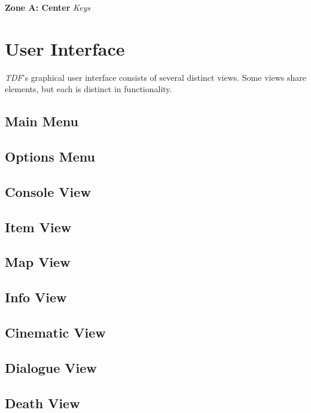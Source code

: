 \documentclass[11pt]{article}
\begin{document}
	\textbf{Zone A: Center}
	\textit{Keys}
	
	\section{User Interface}
	
	\textit{TDF}'s graphical user interface consists of several distinct views. Some views share elements, but each is distinct in functionality.
	
	\subsection{Main Menu}
	
	\subsection{Options Menu}
	
	\subsection{Console View}
	
	\subsection{Item View}
	
	\subsection{Map View}
	
	\subsection{Info View}
	
	\subsection{Cinematic View}
	
	\subsection{Dialogue View}
	
	\subsection{Death View}
	
\end{document}
